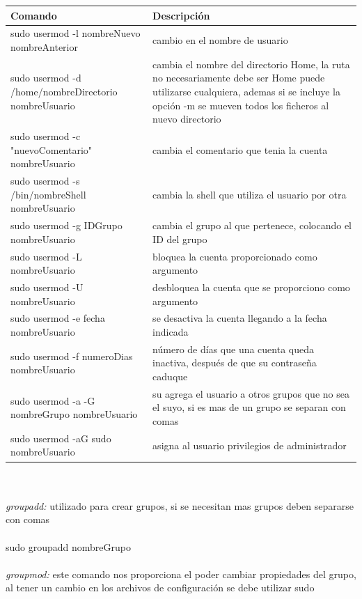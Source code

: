 \documentclass[10pt,a4paper,titlepage]{article}
\begin{document}
	\begin{tabular}{|p{7cm}|p{7cm}|}
		\hline
		Comando & Descripción \\
		\hline
		sudo usermod -l nombreNuevo nombreAnterior & cambio en el nombre de usuario \\
		\hline
		sudo usermod -d /home/nombreDirectorio nombreUsuario & cambia el nombre del directorio Home, la ruta no necesariamente debe ser Home puede utilizarse cualquiera, ademas si se incluye la opción -m se mueven todos los ficheros al nuevo directorio \\
		\hline
		sudo usermod -c "nuevoComentario" nombreUsuario & cambia el comentario que tenia la cuenta \\
		\hline
		sudo usermod -s /bin/nombreShell nombreUsuario & cambia la shell que utiliza el usuario por otra \\
		\hline
		sudo usermod -g IDGrupo nombreUsuario & cambia el grupo al que pertenece, colocando el ID del grupo \\
		\hline
		sudo usermod -L nombreUsuario & bloquea la cuenta proporcionado como argumento \\
		\hline
		sudo usermod -U nombreUsuario & desbloquea la cuenta que se proporciono como argumento \\
		\hline
		sudo usermod -e fecha nombreUsuario & se desactiva la cuenta llegando a la fecha indicada \\
		\hline
		sudo usermod -f numeroDias nombreUsuario & número de días que una cuenta queda inactiva, después de que su contraseña caduque \\
		\hline
		sudo usermod -a -G nombreGrupo nombreUsuario & su agrega el usuario a otros grupos que no sea el suyo, si es mas de un grupo se separan con comas \\
		\hline
		sudo usermod -aG sudo nombreUsuario & asigna al usuario privilegios de administrador \\
		\hline
	\end{tabular}
	\\
	\\
	\emph{groupadd:} utilizado para crear grupos, si se necesitan mas grupos deben separarse con comas
	\\
	\\
	sudo groupadd nombreGrupo
	\\
	\\
	\emph{groupmod:} este comando nos proporciona el poder cambiar propiedades del grupo, al tener un cambio en los archivos de configuración se debe utilizar sudo
	\\
\end{document}
